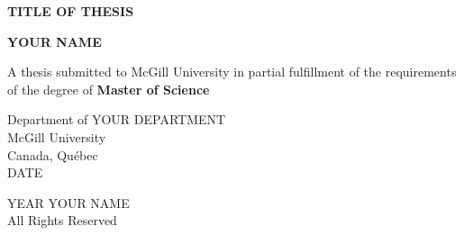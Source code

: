 %
%

\begin{titlepage}
    \begin{center}
        \vspace*{1cm}

        \huge
        \textbf{TITLE OF THESIS}

        \vspace{0.5cm}
        \large

        \vspace{1.5cm}

        \textbf{YOUR NAME}

        \vfill

        A thesis submitted to McGill University in partial fulfillment of the requirements of the degree of \textbf{Master of Science}

        \vspace{0.8cm}
       

        \large
        Department of YOUR DEPARTMENT\\
        McGill University\\
        Canada, Qu\'{e}bec\\
        DATE

        \vspace{1.5cm}

        \textcopyright{} YEAR YOUR NAME\\
        All Rights Reserved
    \end{center}
\end{titlepage}
